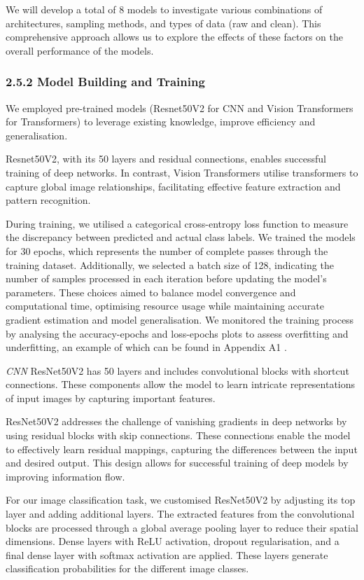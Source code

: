 \documentclass[letterpaper,9pt,twocolumn,twoside,]{pinp}
\begin{document}
We will develop a total of 8 models to investigate various combinations
of architectures, sampling methods, and types of data (raw and clean).
This comprehensive approach allows us to explore the effects of these
factors on the overall performance of the models.

\hypertarget{model-building-and-training}{%
\subsubsection{2.5.2 Model Building and
Training}\label{model-building-and-training}}

We employed pre-trained models (Resnet50V2 for CNN and Vision
Transformers for Transformers) to leverage existing knowledge, improve
efficiency and generalisation.

Resnet50V2, with its 50 layers and residual connections, enables
successful training of deep networks. In contrast, Vision Transformers
utilise transformers to capture global image relationships, facilitating
effective feature extraction and pattern recognition.

During training, we utilised a categorical cross-entropy loss function
to measure the discrepancy between predicted and actual class labels. We
trained the models for 30 epochs, which represents the number of
complete passes through the training dataset. Additionally, we selected
a batch size of 128, indicating the number of samples processed in each
iteration before updating the model's parameters. These choices aimed to
balance model convergence and computational time, optimising resource
usage while maintaining accurate gradient estimation and model
generalisation. We monitored the training process by analysing the
accuracy-epochs and loss-epochs plots to assess overfitting and
underfitting, an example of which can be found in Appendix A1 .

\emph{CNN} ResNet50V2 has 50 layers and includes convolutional blocks
with shortcut connections. These components allow the model to learn
intricate representations of input images by capturing important
features.

ResNet50V2 addresses the challenge of vanishing gradients in deep
networks by using residual blocks with skip connections. These
connections enable the model to effectively learn residual mappings,
capturing the differences between the input and desired output. This
design allows for successful training of deep models by improving
information flow.

For our image classification task, we customised ResNet50V2 by adjusting
its top layer and adding additional layers. The extracted features from
the convolutional blocks are processed through a global average pooling
layer to reduce their spatial dimensions. Dense layers with ReLU
activation, dropout regularisation, and a final dense layer with softmax
activation are applied. These layers generate classification
probabilities for the different image classes.
\end{document}
